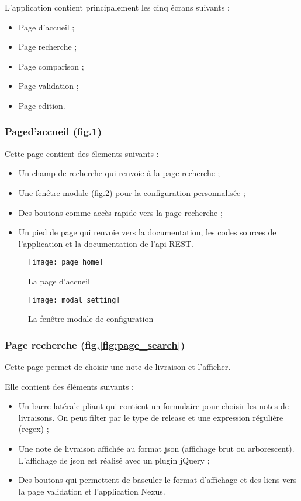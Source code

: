 \begin{minipage}{\textwidth}
L'application contient principalement les cinq écrans suivants :
  \begin{itemize}
   \item Page d'accueil ;
   \item Page recherche ;
   \item Page comparison ;
   \item Page validation ;
   \item Page edition.
  \end{itemize}
\end{minipage}

\subsubsection{Paged'accueil (fig.\ref{fig:page_home})}

Cette page contient des élements suivants :
\begin{itemize}
 \item Un champ de recherche qui renvoie à la page recherche ;
 \item Une fenêtre modale (fig.\ref{fig:modal_setting}) pour la configuration personnalisée ;
 \item Des boutons comme accès rapide vers la page recherche ;
 \item Un pied de page qui renvoie vers la documentation, les codes sources de l'application et la documentation de l'api REST.
\end{itemize}

\begin{figure}[ht]
 \centering
 \texttt{[image: page\_home]}
 \caption{La page d'accueil}
 \label{fig:page_home}
\end{figure}

\begin{figure}[ht]
 \centering
 \texttt{[image: modal\_setting]}
 \caption{La fenêtre modale de configuration}
 \label{fig:modal_setting}
\end{figure}

\subsubsection{Page recherche (fig.\ref{fig:page_search})}
Cette page permet de choisir une note de livraison et l'afficher.

Elle contient des éléments suivants :
\begin{itemize}
 \item Un barre latérale pliant qui contient un formulaire pour choisir les notes de livraisons.
       On peut filter par le type de release et une expression régulière (regex) ;
 \item Une note de livraison affichée au format json (affichage brut ou arborescent).
       L'affichage de json est réalisé avec un plugin jQuery ;
 \item Des boutons qui permettent de basculer le format d'affichage et des liens vers la page validation et l'application Nexus.
\end{itemize}

